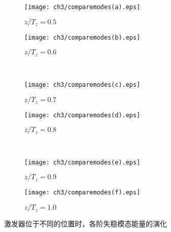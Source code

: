\begin{figure}[H]
    \centering
    \begin{subfigure}{0.45\textwidth}           %
        \texttt{[image: ch3/comparemodes(a).eps]}
        \caption{$z/T_z = 0.5$}\label{f:a}
    \end{subfigure}
    \begin{subfigure}{0.45\textwidth}           %
        \texttt{[image: ch3/comparemodes(b).eps]}
        \caption{$z/T_z = 0.6$}\label{f:b} 
    \end{subfigure}
    \\ \bigskip
    \begin{subfigure}{0.45\textwidth}         %
        \texttt{[image: ch3/comparemodes(c).eps]}
        \caption{$z/T_z = 0.7$}\label{f:c}
    \end{subfigure}
    \begin{subfigure}{0.45\textwidth}          %
        \texttt{[image: ch3/comparemodes(d).eps]}
        \caption{$z/T_z = 0.8$}\label{f:d}
    \end{subfigure}
    \\ \bigskip
    \begin{subfigure}{0.45\textwidth}         %
        \texttt{[image: ch3/comparemodes(e).eps]}
        \caption{$z/T_z = 0.9$}\label{f:e}
    \end{subfigure}
    \begin{subfigure}{0.45\textwidth}          %
        \texttt{[image: ch3/comparemodes(f).eps]}
        \caption{$z/T_z = 1.0$}\label{f:f}
    \end{subfigure}
    \caption{激发器位于不同的位置时，各阶失稳模态能量的演化}
    \label{f:spanwiseeffect} %
\end{figure}
